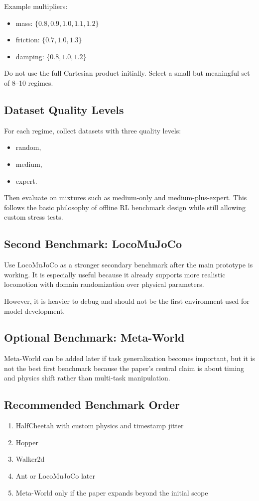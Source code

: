 \documentclass[11pt]{article}
\begin{document}
Example multipliers:
\begin{itemize}[leftmargin=1.5em]
    \item mass: $\{0.8, 0.9, 1.0, 1.1, 1.2\}$
    \item friction: $\{0.7, 1.0, 1.3\}$
    \item damping: $\{0.8, 1.0, 1.2\}$
\end{itemize}

Do not use the full Cartesian product initially. Select a small but meaningful set of 8--10 regimes.

\subsection{Dataset Quality Levels}
For each regime, collect datasets with three quality levels:
\begin{itemize}[leftmargin=1.5em]
    \item random,
    \item medium,
    \item expert.
\end{itemize}

Then evaluate on mixtures such as medium-only and medium-plus-expert. This follows the basic philosophy of offline RL benchmark design while still allowing custom stress tests.

\subsection{Second Benchmark: LocoMuJoCo}
Use LocoMuJoCo as a stronger secondary benchmark after the main prototype is working. It is especially useful because it already supports more realistic locomotion with domain randomization over physical parameters.

However, it is heavier to debug and should not be the first environment used for model development.

\subsection{Optional Benchmark: Meta-World}
Meta-World can be added later if task generalization becomes important, but it is not the best first benchmark because the paper's central claim is about timing and physics shift rather than multi-task manipulation.

\subsection{Recommended Benchmark Order}
\begin{enumerate}[leftmargin=1.5em]
    \item HalfCheetah with custom physics and timestamp jitter
    \item Hopper
    \item Walker2d
    \item Ant or LocoMuJoCo later
    \item Meta-World only if the paper expands beyond the initial scope
\end{enumerate}
\end{document}
